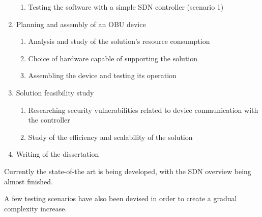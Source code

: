 \begin{enumerate}
\begin{enumerate}
        \item Testing the software with a simple SDN controller (scenario 1)
    \end{enumerate}
    \item Planning and assembly of an OBU device
    \begin{enumerate}
        \item Analysis and study of the solution's resource consumption 
        \item Choice of hardware capable of supporting the solution
        \item Assembling the device and testing its operation
    \end{enumerate}
    \item Solution feasibility study
    \begin{enumerate}
        \item Researching security vulnerabilities related to device communication with the controller
        \item Study of the efficiency and scalability of the solution
    \end{enumerate}
    \item Writing of the dissertation
\end{enumerate}

Currently the state-of-the art is being developed, with the SDN overview being almost finished.


A few testing scenarios have also been devised in order to create a gradual complexity increase. 


